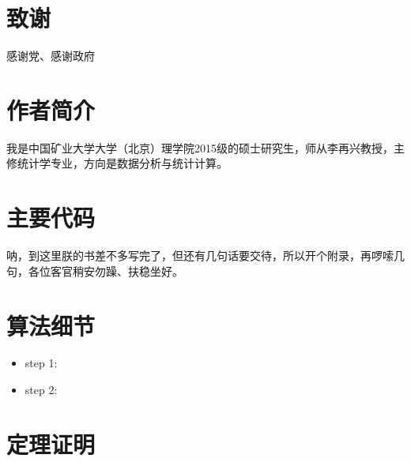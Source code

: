 \backmatter


\chapter{致谢}\label{ack}


感谢党、感谢政府


\chapter{作者简介}\label{author}


我是中国矿业大学大学（北京）理学院2015级的硕士研究生，师从李再兴教授，主修统计学专业，方向是数据分析与统计计算。


\mainmatter

\appendix

\chapter{主要代码}\label{sound}

呐，到这里朕的书差不多写完了，但还有几句话要交待，所以开个附录，再啰嗦几句，各位客官稍安勿躁、扶稳坐好。

\chapter{算法细节}

\begin{itemize}
\tightlist
\item
  step 1:
\item
  step 2:
\end{itemize}

\chapter{定理证明}

